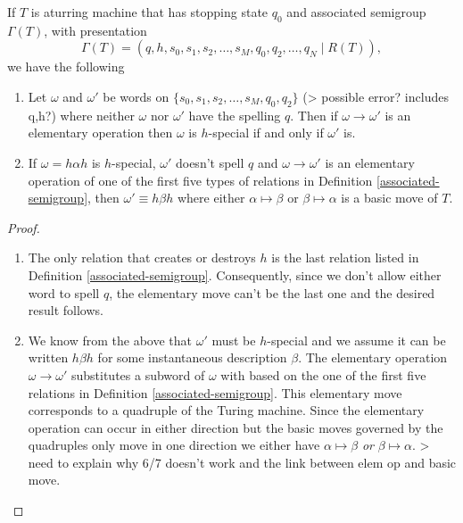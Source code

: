 \begin{lemma}
  \label{lem:gamma-prop}
  If $T$ is aturring machine that has stopping state $q_0$ and associated semigroup $\Gamma(T)$, with presentation
  \begin{equation*}
    \Gamma(T) = (q,h,s_0,s_1,s_2, \dots, s_M, q_0,q_2, \dots, q_N \mid R(T)), 
  \end{equation*}
  we have the following
  \begin{enumerate}
  \item Let $\omega$ and $\omega'$ be words on $\{s_0,s_1,s_2, \dots, s_M, q_0,q_2\}$ (> possible error? includes q,h?) where neither $\omega$ nor $\omega'$ have the spelling $q$. Then if $\omega \rightarrow \omega'$ is an elementary operation then $\omega$ is $h$-special if and only if $\omega'$ is.
  \item If $\omega = h\alpha h$ is $h$-special, $\omega'$ doesn't spell $q$ and $\omega \rightarrow \omega'$ is an elementary operation of one of the first five types of relations in Definition \ref{associated-semigroup}, then $\omega' \equiv h\beta h$  where either $\alpha \mapsto \beta$ or $\beta \mapsto \alpha$ is a basic move of $T$.
  \end{enumerate}
\end{lemma}

\begin{proof}
  \begin{enumerate}
  \item The only relation that creates or destroys $h$ is the last relation listed in Definition \ref{associated-semigroup}. Consequently, since we don't allow either word to spell $q$, the elementary move can't be the last one and the desired result follows.
  \item We know from the above that $\omega'$ must be $h$-special and we assume it can be written $h\beta h$ for some instantaneous description $\beta$. The elementary operation $\omega \rightarrow \omega'$ substitutes a subword of $\omega$ with based on the one of the first five relations in Definition \ref{associated-semigroup}. This elementary move corresponds to a quadruple of the Turing machine. Since the elementary operation can occur in either direction but the basic moves governed by the quadruples only move in one direction we either have $\alpha \mapsto \beta$ \emph{or} $\beta \mapsto \alpha$. > need to explain why 6/7 doesn't work and the link between elem op and basic move.
  \end{enumerate}
\end{proof}

